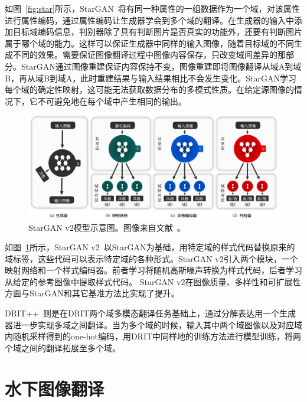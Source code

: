 如图~\ref{fig:star}所示，StarGAN~\cite{choi2018stargan}将有同一种属性的一组数据作为一个域，对该属性进行属性编码，通过属性编码让生成器学会到多个域的翻译。在生成器的输入中添加目标域编码信息，判别器除了具有判断图片是否真实的功能外，还要有判断图片属于哪个域的能力。这样可以保证生成器中同样的输入图像，随着目标域的不同生成不同的效果。需要保证图像翻译过程中图像内容保存，只改变域间差异的那部分。StarGAN通过图像重建保证内容保持不变，图像重建即将图像翻译从域A到域B，再从域B到域A，此时重建结果与输入结果相比不会发生变化。StarGAN学习每个域的确定性映射，这可能无法获取数据分布的多模式性质。在给定源图像的情况下，它不可避免地在每个域中产生相同的输出。

\begin{figure}[ht]
    \centering
	\includegraphics[width=\textwidth]{figures/starv2.png}
	\caption{StarGAN v2模型示意图。图像来自文献~\cite{choi2020stargan}。}
	\label{fig:starv2}
\end{figure}

如图~\ref{fig:starv2}所示，StarGAN v2~\cite{choi2020stargan}以StarGAN为基础，用特定域的样式代码替换原来的域标签，这些代码可以表示特定域的各种形式。StarGAN v2引入两个模块，一个映射网络和一个样式编码器。前者学习将随机高斯噪声转换为样式代码，后者学习从给定的参考图像中提取样式代码。
StarGAN v2在图像质量、多样性和可扩展性方面与StarGAN和其它基准方法比实现了提升。


DRIT++~\cite{lee2020drit++}则是在DRIT两个域多模态翻译任务基础上，通过分解表达用一个生成器进一步实现多域之间翻译。当为多个域的时候，输入其中两个域图像以及对应域内随机采样得到的one-hot编码，用DRIT中同样地的训练方法进行模型训练，将两个域之间的翻译拓展至多个域。

\section{水下图像翻译}\label{sec:underwater}
